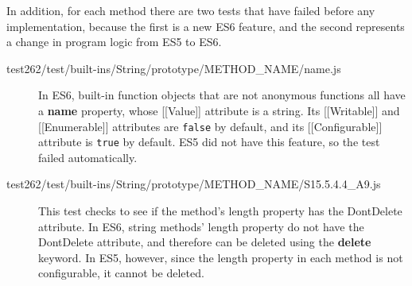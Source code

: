 \documentclass[a4paper,11pt,twoside]{report}
\begin{document}
In addition, for each method there are two tests that have failed before any implementation, because the first is a new ES6 feature, and the second represents a change in program logic from ES5 to ES6.

\begin{description}
\item[test262/test/built-ins/String/prototype/METHOD\_NAME/name.js] In ES6, built-in function objects that are not anonymous functions all have a \textbf{name} property, whose [[Value]] attribute is a string. Its [[Writable]] and [[Enumerable]] attributes are \texttt{false} by default, and its [[Configurable]] attribute is \texttt{true} by default. ES5 did not have this feature, so the test failed automatically.

\item[test262/test/built-ins/String/prototype/METHOD\_NAME/S15.5.4.4\_A9.js] This test checks to see if the method's length property has the DontDelete attribute. In ES6, string methods' length property do not have the DontDelete attribute, and therefore can be deleted using the \textbf{delete} keyword. In ES5, however, since the length property in each method is not configurable, it cannot be deleted.
\end{description}
\end{document}
